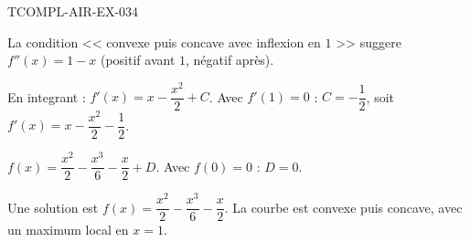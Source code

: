 \begin{corrige}{TCOMPL-AIR-EX-034}

La condition << convexe puis concave avec inflexion en $1$ >> suggere $f''(x) = 1 - x$ (positif avant $1$, négatif après).


En integrant : $f'(x) = x - \dfrac{x^2}{2} + C$. Avec $f'(1)=0$ : $C = -\dfrac{1}{2}$, soit $f'(x) = x - \dfrac{x^2}{2} - \dfrac{1}{2}$.

$f(x) = \dfrac{x^2}{2} - \dfrac{x^3}{6} - \dfrac{x}{2} + D$. Avec $f(0)=0$ : $D=0$.

Une solution est $\boxed{f(x) = \dfrac{x^2}{2} - \dfrac{x^3}{6} - \dfrac{x}{2}}$. La courbe est convexe puis concave, avec un maximum local en $x=1$.

\end{corrige}

